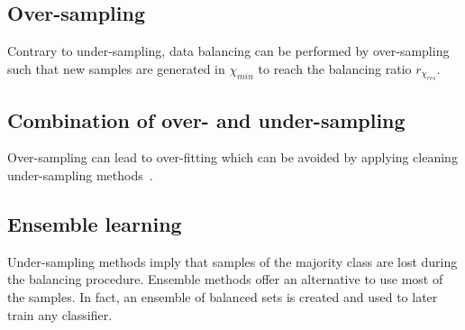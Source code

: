 \documentclass[twoside,11pt]{article}
\begin{document}
\subsection{Over-sampling}

Contrary to under-sampling, data balancing can be performed by over-sampling such that new samples are generated in $\chi_{min}$ to reach the balancing ratio $r_{\chi_{res}}$.



\subsection{Combination of over- and under-sampling}

Over-sampling can lead to over-fitting which can be avoided by applying cleaning under-sampling methods~\citep{prati2009data}.


\subsection{Ensemble learning}

Under-sampling methods imply that samples of the majority class are lost during the balancing procedure.
Ensemble methods offer an alternative to use most of the samples.
In fact, an ensemble of balanced sets is created and used to later train any classifier.
\end{document}
